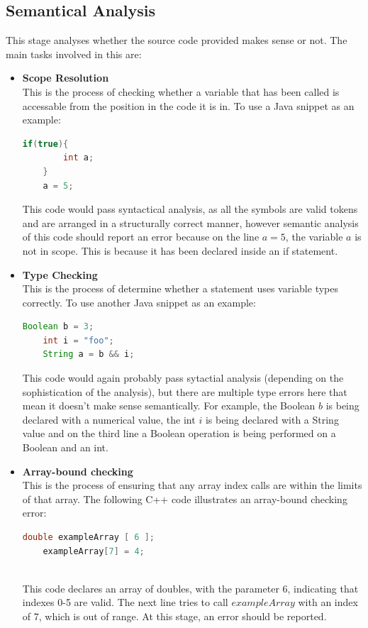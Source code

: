 \documentclass[ %
                    author={Jonathan Rankin},
                supervisor={Dr. David May, Dr. Ian Holyer},
                    degree={MEng},
                     title={CodeTouch},
                  subtitle={A Revolutionary Way To Program Real Code On Touch Screen Devices},
                      type={enterprise},
                      year={2015 } ]{dissertation}
\begin{document}
\subsection{Semantical Analysis}
This stage analyses whether the source code provided makes sense or not. The main tasks involved in this are:
\begin{itemize}
\item \textbf{Scope Resolution} \\ This is the process of checking whether a variable that has been called is accessable from the position in the code it is in. To use a Java snippet as an example:
\begin{lstlisting}[language=Java]
    if(true){
        int a;
    }
    a = 5;
\end{lstlisting}
This code would pass syntactical analysis, as all the symbols are valid tokens and are arranged in a structurally correct manner, however semantic analysis of this code should report an error because on the line $a = 5$, the variable $a$ is not in scope. This is because it has been declared inside an if statement.
\\
\item \textbf{Type Checking} \\ This is the process of determine whether a statement uses variable types correctly. To use another Java snippet as an example:
\begin{lstlisting}[language=Java]
    Boolean b = 3;
    int i = "foo";
    String a = b && i;
\end{lstlisting}

This code would again probably pass sytactial analysis (depending on the sophistication of the analysis), but there are multiple type errors here that mean it doesn't make sense semantically. For example, the Boolean $b$ is being declared with a numerical value, the int $i$ is being declared with a String value and on the third line a Boolean operation is being performed on a Boolean and an int.
\\
\item \textbf{Array-bound checking} \\ This is the process of ensuring that any array index calls are within the limits of that array. The following C++ code illustrates an array-bound checking error:
\begin{lstlisting}[language=Java]
    double exampleArray [ 6 ];
    exampleArray[7] = 4;
    
\end{lstlisting}

This code declares an array of doubles, with the parameter 6, indicating that indexes 0-5 are valid. The next line tries to call $exampleArray$ with an index of 7, which is out of range. At this stage, an error should be reported.  


\end{itemize}
\end{document}

